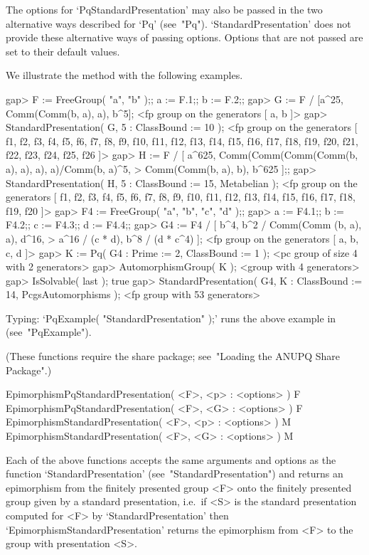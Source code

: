 \enditems

The options for `PqStandardPresentation' may also be passed  in  the  two
alternative ways described for  `Pq'  (see~"Pq").  `StandardPresentation'
does not provide these alternative ways of passing options. Options  that
are not passed are set to their default values.

We illustrate the method with the following examples.

\beginexample
gap> F := FreeGroup( "a", "b" );; a := F.1;; b := F.2;;
gap> G := F / [a^25, Comm(Comm(b, a), a), b^5];        
<fp group on the generators [ a, b ]>
gap> StandardPresentation( G, 5 : ClassBound := 10 );  
<fp group on the generators [ f1, f2, f3, f4, f5, f6, f7, f8, f9, f10, f11, 
  f12, f13, f14, f15, f16, f17, f18, f19, f20, f21, f22, f23, f24, f25, f26 ]>
gap> H := F / [ a^625, Comm(Comm(Comm(Comm(b, a), a), a), a)/Comm(b, a)^5,
>               Comm(Comm(b, a), b), b^625 ];;                     
gap> StandardPresentation( H, 5 : ClassBound := 15, Metabelian );
<fp group on the generators [ f1, f2, f3, f4, f5, f6, f7, f8, f9, f10, f11, 
  f12, f13, f14, f15, f16, f17, f18, f19, f20 ]>
gap> F4 := FreeGroup( "a", "b", "c", "d" );;                        
gap> a := F4.1;; b := F4.2;; c := F4.3;; d := F4.4;;
gap> G4 := F4 / [ b^4, b^2 / Comm(Comm (b, a), a), d^16,                
>                 a^16 / (c * d), b^8 / (d * c^4) ];
<fp group on the generators [ a, b, c, d ]>
gap> K := Pq( G4 : Prime := 2, ClassBound := 1 );
<pc group of size 4 with 2 generators>
gap> AutomorphismGroup( K );
<group with 4 generators>
gap> IsSolvable( last );
true
gap> StandardPresentation( G4, K : ClassBound := 14, PcgsAutomorphisms );
<fp group with 53 generators>
\endexample

Typing: `PqExample( "StandardPresentation" );' runs the above example  in
{\GAP} (see~"PqExample").

(These functions require the {\ANUPQ}  share  package;  see~"Loading  the
ANUPQ Share Package".)

\>EpimorphismPqStandardPresentation( <F>, <p> : <options> ) F
\>EpimorphismPqStandardPresentation( <F>, <G> : <options> ) F
\>EpimorphismStandardPresentation( <F>, <p> : <options> ) M
\>EpimorphismStandardPresentation( <F>, <G> : <options> ) M

Each of the above functions accepts the same arguments and options as the
function `StandardPresentation' (see~"StandardPresentation") and  returns
an epimorphism from the finitely presented group <F>  onto  the  finitely
presented group given by a standard  presentation,  i.e.~if  <S>  is  the
standard presentation computed for  <F>  by  `StandardPresentation'  then
`EpimorphismStandardPresentation' returns the epimorphism from <F> to the
group with presentation <S>.

